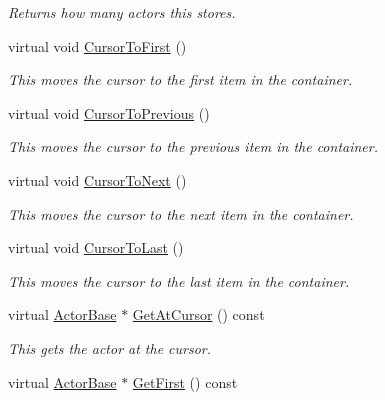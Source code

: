 \begin{DoxyCompactItemize}
\begin{DoxyCompactList}\small\item\em Returns how many actors this stores. \item\end{DoxyCompactList}\item 
virtual void \hyperlink{classphys_1_1ActorContainerVector_ad9c2eb2a9405dcf687c86745afc9c031}{CursorToFirst} ()
\begin{DoxyCompactList}\small\item\em This moves the cursor to the first item in the container. \item\end{DoxyCompactList}\item 
virtual void \hyperlink{classphys_1_1ActorContainerVector_ac483bcdf348f55dc8b04a8805a002413}{CursorToPrevious} ()
\begin{DoxyCompactList}\small\item\em This moves the cursor to the previous item in the container. \item\end{DoxyCompactList}\item 
virtual void \hyperlink{classphys_1_1ActorContainerVector_a1c72366a6261d8e98dc0a9d2fad9f70f}{CursorToNext} ()
\begin{DoxyCompactList}\small\item\em This moves the cursor to the next item in the container. \item\end{DoxyCompactList}\item 
virtual void \hyperlink{classphys_1_1ActorContainerVector_aa6b08266bbb57a22c07ab50514e58db4}{CursorToLast} ()
\begin{DoxyCompactList}\small\item\em This moves the cursor to the last item in the container. \item\end{DoxyCompactList}\item 
virtual \hyperlink{classphys_1_1ActorBase}{ActorBase} $\ast$ \hyperlink{classphys_1_1ActorContainerVector_a280700490b368a963dd8feae044c7a6d}{GetAtCursor} () const 
\begin{DoxyCompactList}\small\item\em This gets the actor at the cursor. \item\end{DoxyCompactList}\item 
virtual \hyperlink{classphys_1_1ActorBase}{ActorBase} $\ast$ \hyperlink{classphys_1_1ActorContainerVector_a55ceecd017455f3185aa62798811e3c6}{GetFirst} () const 

\end{DoxyCompactItemize}
